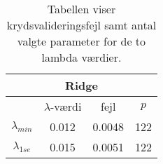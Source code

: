 \begin{table}
\center
\begin{tabular}{cccc}
\toprule
\multicolumn{4}{c}{Ridge} \\ \midrule
 & $\lambda$-værdi & fejl &$ p$ \\ 
 $\lambda_{min}$ & 0.012 & 0.0048 & 122 \\ 
 $\lambda_{1se}$ & 0.015 & 0.0051 & 122 \\ \bottomrule
\end{tabular}
\caption{Tabellen viser krydsvalideringsfejl samt antal valgte parameter for de to lambda værdier.  } \label{tab:cv_ridge}
\end{table}